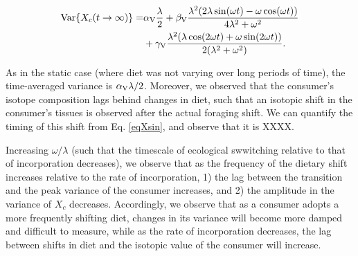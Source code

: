 \documentclass{frontiersSCNS}
\begin{document}
\begin{align}
  \label{eqXsin}
  \begin{split}
    {\rm Var}\{X_c(t \to \infty)\} = &\alpha_{\rm V}\frac{\lambda}{2} + \beta_{\rm V}\frac{\lambda^2(2\lambda\sin(\omega t )-\omega \cos(\omega t))}{4\lambda^2 + \omega^2} \\
    &+ \gamma_{\rm V}\frac{\lambda^2(\lambda \cos(2\omega t )+\omega \sin(2\omega t))}{2(
    \lambda^2 + \omega^2)}.
  \end{split}
\end{align}

\noindent As in the static case (where diet was not varying over long periods of time), the time-averaged variance is $\alpha_{\rm V}\lambda/2$.
Moreover, we observed that the consumer's isotope composition lags behind changes in diet, such that an isotopic shift in the consumer's tissues is observed after the actual foraging shift.
We can quantify the timing of this shift from Eq. \ref{eqXsin}, and observe that it is XXXX.


Increasing $\omega/\lambda$ (such that the timescale of ecological swwitching relative to that of incorporation decreases), we observe that as the frequency of the dietary shift increases relative to the rate of incorporation,
1) the lag between the transition and the peak variance of the consumer increases, and
2) the amplitude in the variance of $X_c$ decreases.
Accordingly, we observe that as a consumer adopts a more frequently shifting diet, changes in its variance will become more damped and difficult to measure, while as the rate of incorporation decreases, the lag between shifts in diet and the isotopic value of the consumer will increase.
\end{document}
